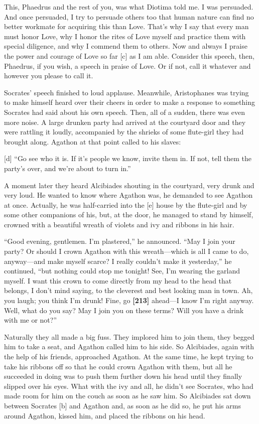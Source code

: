 This, Phaedrus and the rest of you, was what Diotima told me. I was
persuaded. And once persuaded, I try to persuade others too that human
nature can find no better workmate for acquiring this than Love. That's
why I say that every man must honor Love, why I honor the rites of Love
myself and practice them with special diligence, and why I commend them
to others. Now and always I praise the power and courage of Love so far
{[}c{]} as I am able. Consider this speech, then, Phaedrus, if you wish,
a speech in praise of Love. Or if not, call it whatever and however you
please to call it.\crlf
\crlf

Socrates' speech finished to loud applause. Meanwhile, Aristophanes was
trying to make himself heard over their cheers in order to make a
response to something Socrates had said about his own
speech. Then, all of
a sudden, there was even more noise. A large drunken party had arrived
at the courtyard door and they were rattling it loudly, accompanied by
the shrieks of some flute-girl they had brought along. Agathon at that
point called to his slaves:

{[}d{]} “Go see who it is. If it's people we know, invite them in. If
not, tell them the party's over, and we're about to turn in.”

A moment later they heard Alcibiades shouting in the courtyard, very
drunk and very loud. He wanted to know where Agathon was, he demanded to
see Agathon at once. Actually, he was half-carried into the {[}e{]}
house by the flute-girl and by some other companions of his, but, at the
door, he managed to stand by himself, crowned with a beautiful wreath of
violets and ivy and ribbons in his hair.

“Good evening, gentlemen. I'm plastered,” he announced. “May I join your
party? Or should I crown Agathon with this wreath---which is all I came
to do, anyway---and make myself scarce? I really couldn't make it
yesterday,” he continued, “but nothing could stop me tonight! See, I'm
wearing the garland myself. I want this crown to come directly from my
head to the head that belongs, I don't mind saying, to the cleverest and
best looking man in town. Ah, you laugh; you think I'm drunk! Fine, go
{\bf {[}213{]}} ahead---I know I'm right anyway. Well, what do you say?
May I join you on these terms? Will you have a drink with me or not?”

Naturally they all made a big fuss. They implored him to join them, they
begged him to take a seat, and Agathon called him to his side. So
Alcibiades, again with the help of his friends, approached Agathon. At
the same time, he kept trying to take his ribbons off so that he could
crown Agathon with them, but all he succeeded in doing was to push them
further down his head until they finally slipped over his eyes. What
with the ivy and all, he didn't see Socrates, who had made room for him
on the couch as soon as he saw him. So Alcibiades sat down between
Socrates {[}b{]} and Agathon and, as soon as he did so, he put his arms
around Agathon, kissed him, and placed the ribbons on his head.

